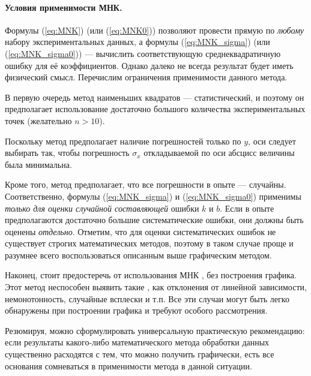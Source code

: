 \paragraph{Условия применимости МНК.}

Формулы (\ref{eq:MNK}) (или (\ref{eq:MNK0})) позволяют провести
прямую по \emph{любому} набору экспериментальных данных, а формулы
(\ref{eq:MNK_sigma}) (или (\ref{eq:MNK_sigma0})) --- вычислить
соответствующую среднеквадратичную ошибку для её коэффициентов. Однако
далеко не всегда результат будет иметь физический смысл. Перечислим
ограничения применимости данного метода.

В первую очередь метод наименьших квадратов --- статистический,
и поэтому он предполагает использование достаточно большого количества
экспериментальных точек (желательно $n>10$).

Поскольку метод предполагает наличие погрешностей только по $y$,
оси следует выбирать так, чтобы погрешность $\sigma_{x}$ откладываемой
по оси абсцисс величины была минимальна.

Кроме того, метод предполагает, что все погрешности в опыте ---
случайны. Соответственно, формулы (\ref{eq:MNK_sigma}) и (\ref{eq:MNK_sigma0})
применимы \emph{только для оценки случайной составляющей} ошибки $k$
и $b$. Если в опыте предполагаются достаточно большие систематические
ошибки, они должны быть оценены \emph{отдельно}. Отметим, что для
оценки систематических ошибок не существует строгих математических
методов, поэтому в таком случае проще и разумнее всего воспользоваться
описанным выше графическим методом.

Наконец, стоит предостеречь от использования МНК ,
без построения графика. Этот метод неспособен выявить такие ,
как отклонения от линейной зависимости, немонотонность, случайные
всплески и т.п. Все эти случаи могут быть легко обнаружены при построении
графика и требуют особого рассмотрения.

Резюмируя, можно сформулировать универсальную практическую рекомендацию:
если результаты какого-либо математического метода обработки данных
существенно расходятся с тем, что можно получить 
графически, есть все основания сомневаться в применимости метода в
данной ситуации.